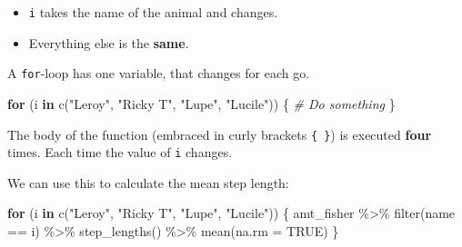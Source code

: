 \documentclass[ignorenonframetext,,t]{beamer}
\let\oldtextbf\textbf
\renewcommand{\textbf}[1]{\textcolor{spamwell}{\oldtextbf{#1}}}
\providecommand{\tightlist}{%
\setlength{\itemsep}{0pt}\setlength{\parskip}{0pt}}
\newenvironment{Shaded}{\begin{snugshade}}{\end{snugshade}}
\newcommand{\AttributeTok}[1]{\textcolor[rgb]{0.77,0.63,0.00}{#1}}
\newcommand{\CommentTok}[1]{\textcolor[rgb]{0.56,0.35,0.01}{\textit{#1}}}
\newcommand{\ConstantTok}[1]{\textcolor[rgb]{0.00,0.00,0.00}{#1}}
\newcommand{\ControlFlowTok}[1]{\textcolor[rgb]{0.13,0.29,0.53}{\textbf{#1}}}
\newcommand{\FunctionTok}[1]{\textcolor[rgb]{0.00,0.00,0.00}{#1}}
\newcommand{\NormalTok}[1]{#1}
\newcommand{\SpecialCharTok}[1]{\textcolor[rgb]{0.00,0.00,0.00}{#1}}
\newcommand{\StringTok}[1]{\textcolor[rgb]{0.31,0.60,0.02}{#1}}
\providecommand{\tightlist}{%
\setlength{\itemsep}{0pt}\setlength{\parskip}{0pt}}
\renewcommand{\tightlist}{\setlength{\itemsep}{1.4ex}\setlength{\parskip}{0pt}}
\begin{document}
\begin{frame}[fragile]
\begin{itemize}
\tightlist
\item
  \texttt{i} takes the name of the animal and changes.
\item
  Everything else is the \textbf{same}.
\end{itemize}

A \texttt{for}-loop has one variable, that changes for each go.

\begin{Shaded}
\begin{Highlighting}[]
\ControlFlowTok{for}\NormalTok{ (i }\ControlFlowTok{in} \FunctionTok{c}\NormalTok{(}\StringTok{"Leroy"}\NormalTok{, }\StringTok{"Ricky T"}\NormalTok{, }\StringTok{"Lupe"}\NormalTok{, }\StringTok{"Lucile"}\NormalTok{)) \{}
  \CommentTok{\# Do something}
\NormalTok{\}}
\end{Highlighting}
\end{Shaded}

The body of the function (embraced in curly brackets \texttt{\{\ \}}) is
executed \textbf{four} times. Each time the value of \texttt{i} changes.
\end{frame}

\begin{frame}[fragile]
We can use this to calculate the mean step length:

\begin{Shaded}
\begin{Highlighting}[]
\ControlFlowTok{for}\NormalTok{ (i }\ControlFlowTok{in} \FunctionTok{c}\NormalTok{(}\StringTok{"Leroy"}\NormalTok{, }\StringTok{"Ricky T"}\NormalTok{, }\StringTok{"Lupe"}\NormalTok{, }\StringTok{"Lucile"}\NormalTok{)) \{}
\NormalTok{  amt\_fisher }\SpecialCharTok{\%\textgreater{}\%} \FunctionTok{filter}\NormalTok{(name }\SpecialCharTok{==}\NormalTok{ i) }\SpecialCharTok{\%\textgreater{}\%} 
    \FunctionTok{step\_lengths}\NormalTok{() }\SpecialCharTok{\%\textgreater{}\%} \FunctionTok{mean}\NormalTok{(}\AttributeTok{na.rm =} \ConstantTok{TRUE}\NormalTok{)}
\NormalTok{\}}
\end{Highlighting}
\end{Shaded}
\end{frame}
\end{document}
